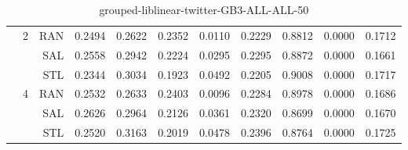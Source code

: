 \begin{center}
\begin{table}[htbp]
\begin{tabular}{ | r | r | r | r | r | r | r | r | r | r | r |}
 & \multirow{3}{*}{2} & RAN & 0.2494 & 0.2622 & 0.2352 & 0.0110 & 0.2229 & 0.8812 & 0.0000 & 0.1712\\ \cline{3-11}
 &   & SAL & 0.2558 & 0.2942 & 0.2224 & 0.0295 & 0.2295 & 0.8872 & 0.0000 & 0.1661\\ \cline{3-11}
 &   & STL & 0.2344 & 0.3034 & 0.1923 & 0.0492 & 0.2205 & 0.9008 & 0.0000 & 0.1717\\ \cline{2-11}
 & \multirow{3}{*}{4} & RAN & 0.2532 & 0.2633 & 0.2403 & 0.0096 & 0.2284 & 0.8978 & 0.0000 & 0.1686\\ \cline{3-11}
 &   & SAL & 0.2626 & 0.2964 & 0.2126 & 0.0361 & 0.2320 & 0.8699 & 0.0000 & 0.1670\\ \cline{3-11}
 &   & STL & 0.2520 & 0.3163 & 0.2019 & 0.0478 & 0.2396 & 0.8764 & 0.0000 & 0.1725\\ \cline{2-11}
\hline
\end{tabular}
\caption{grouped-liblinear-twitter-GB3-ALL-ALL-50}
\end{table}
\end{center}

